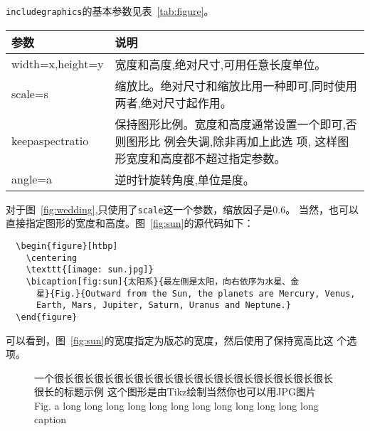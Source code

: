 \texttt{includegraphics}的基本参数见表~\ref{tab:figure}。

\begin{table}[htbp]
  \centering
  \vspace{0.2cm}
  \wuhao
  \begin{tabularx}{0.8\textwidth{}}{lX}
    \toprule
    参数             & 说明 \\
    \midrule
    width=x,height=y & 宽度和高度,绝对尺寸,可用任意长度单位。  \\
    scale=s          & 缩放比。绝对尺寸和缩放比用一种即可,同时使用两者,绝对尺寸起作用。 \\
    keepaspectratio & 保持图形比例。宽度和高度通常设置一个即可,否则图形比
    例会失调,除非再加上此选 项,
    这样图形宽度和高度都不超过指定参数。     \\
    angle=a          & 逆时针旋转角度,单位是度。  \\
    \bottomrule
  \end{tabularx}
\end{table}

对于图~\ref{fig:wedding},只使用了\texttt{scale}这一个参数，缩放因子是0.6。
当然，也可以直接指定图形的宽度和高度。图~\ref{fig:sun}的源代码如下：

\begin{lstlisting}
  \begin{figure}[htbp]
    \centering
    \texttt{[image: sun.jpg]}
    \bicaption[fig:sun]{太阳系}{最左侧是太阳，向右依序为水星、金
      星}{Fig.}{Outward from the Sun, the planets are Mercury, Venus,
      Earth, Mars, Jupiter, Saturn, Uranus and Neptune.}
  \end{figure}
\end{lstlisting}

可以看到，图~\ref{fig:sun}的宽度指定为版芯的宽度，然后使用了保持宽高比这
个选项。

\begin{figure}[tbph]
\usetikzlibrary{calc,through}
  \centering

    {一个很长很长很长很长很长很长很长很长很长很长很长很长很长很长很长的标题示例
    这个图形是由Tikz绘制当然你也可以用JPG图片}
    {Fig.}
    {a long long long long long long long long long long long long caption}
\end{figure}


